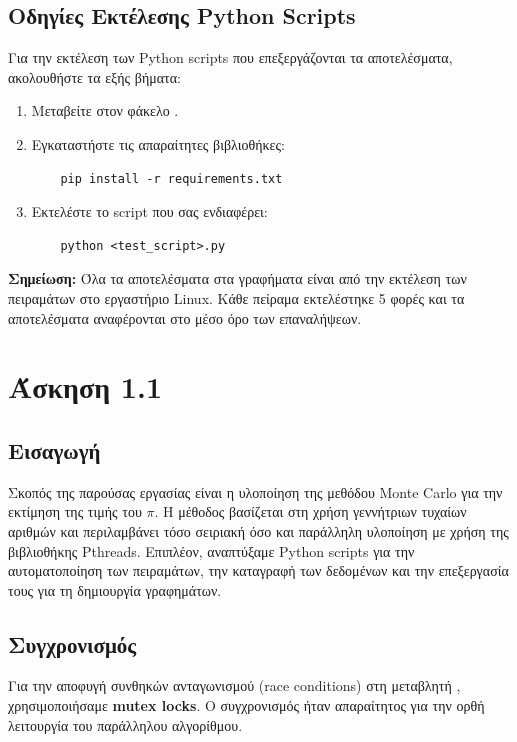 \documentclass{article}
\begin{document}
\subsection*{Οδηγίες Εκτέλεσης Python Scripts}
Για την εκτέλεση των Python scripts που επεξεργάζονται τα αποτελέσματα, ακολουθήστε τα εξής βήματα:
\begin{enumerate}
    \item Μεταβείτε στον φάκελο .
    \item Εγκαταστήστε τις απαραίτητες βιβλιοθήκες:
    \begin{verbatim}
    pip install -r requirements.txt
    \end{verbatim}
    \item Εκτελέστε το script που σας ενδιαφέρει:
    \begin{verbatim}
    python <test_script>.py
    \end{verbatim}
\end{enumerate}
\textbf{Σημείωση:} Όλα τα αποτελέσματα στα γραφήματα είναι από την εκτέλεση των πειραμάτων στο εργαστήριο Linux. Κάθε πείραμα εκτελέστηκε 5 φορές και τα αποτελέσματα αναφέρονται στο μέσο όρο των επαναλήψεων.
\section*{Άσκηση 1.1}
\subsection*{Εισαγωγή}
Σκοπός της παρούσας εργασίας είναι η υλοποίηση της μεθόδου Monte Carlo για την εκτίμηση της τιμής του 
$\pi$. Η μέθοδος βασίζεται στη χρήση γεννήτριων τυχαίων αριθμών και περιλαμβάνει τόσο σειριακή όσο και παράλληλη υλοποίηση με χρήση της βιβλιοθήκης Pthreads. Επιπλέον, αναπτύξαμε Python scripts για την αυτοματοποίηση των πειραμάτων, την καταγραφή των δεδομένων και την επεξεργασία τους για τη δημιουργία γραφημάτων.


\subsection*{Συγχρονισμός}
Για την αποφυγή συνθηκών ανταγωνισμού (race conditions) στη μεταβλητή , χρησιμοποιήσαμε \textbf{mutex locks}. Ο συγχρονισμός ήταν απαραίτητος για την ορθή λειτουργία του παράλληλου αλγορίθμου.
\end{document}
